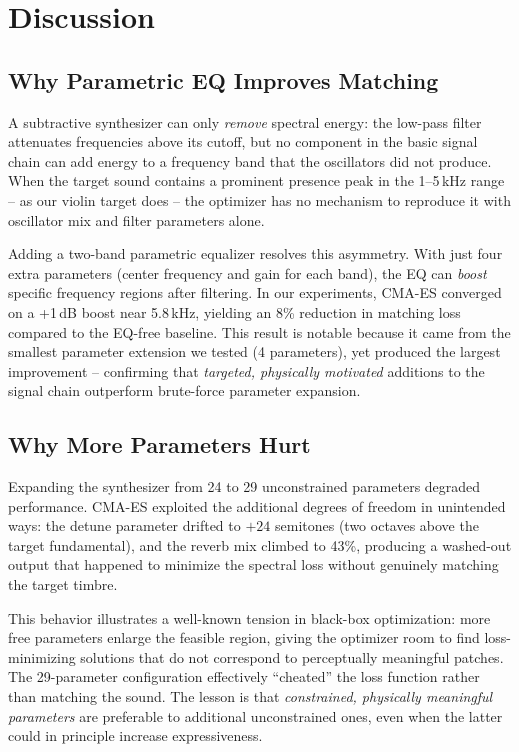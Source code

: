 
\section{Discussion}

\subsection{Why Parametric EQ Improves Matching}

A subtractive synthesizer can only \emph{remove} spectral energy: the low-pass filter attenuates frequencies above its cutoff, but no component in the basic signal chain can add energy to a frequency band that the oscillators did not produce.
When the target sound contains a prominent presence peak in the 1--5\,kHz range -- as our violin target does -- the optimizer has no mechanism to reproduce it with oscillator mix and filter parameters alone.

Adding a two-band parametric equalizer resolves this asymmetry.
With just four extra parameters (center frequency and gain for each band), the EQ can \emph{boost} specific frequency regions after filtering.
In our experiments, CMA-ES converged on a +1\,dB boost near 5.8\,kHz, yielding an 8\% reduction in matching loss compared to the EQ-free baseline.
This result is notable because it came from the smallest parameter extension we tested (4 parameters), yet produced the largest improvement -- confirming that \emph{targeted, physically motivated} additions to the signal chain outperform brute-force parameter expansion.

\subsection{Why More Parameters Hurt}

Expanding the synthesizer from 24 to 29 unconstrained parameters degraded performance.
CMA-ES exploited the additional degrees of freedom in unintended ways: the detune parameter drifted to $+24$ semitones (two octaves above the target fundamental), and the reverb mix climbed to 43\%, producing a washed-out output that happened to minimize the spectral loss without genuinely matching the target timbre.

This behavior illustrates a well-known tension in black-box optimization: more free parameters enlarge the feasible region, giving the optimizer room to find loss-minimizing solutions that do not correspond to perceptually meaningful patches.
The 29-parameter configuration effectively ``cheated'' the loss function rather than matching the sound.
The lesson is that \emph{constrained, physically meaningful parameters} are preferable to additional unconstrained ones, even when the latter could in principle increase expressiveness.

